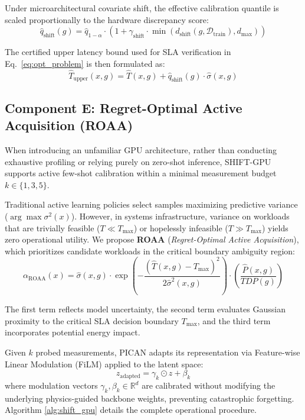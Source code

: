 \documentclass[3p,12pt]{elsarticle}
\begin{document}
Under microarchitectural covariate shift, the effective calibration quantile is scaled proportionally to the hardware discrepancy score:
\begin{equation}
\hat{q}_{\text{shift}}(g) = \hat{q}_{1-\alpha} \cdot \left(1 + \gamma_{\text{shift}} \cdot \min\left(d_{\text{shift}}(g, \mathcal{D}_{\text{train}}), d_{\max}\right)\right)
\end{equation}

The certified upper latency bound used for SLA verification in Eq.~\eqref{eq:opt_problem} is then formulated as:
\begin{equation}
\hat{T}_{\text{upper}}(x, g) = \hat{T}(x, g) + \hat{q}_{\text{shift}}(g) \cdot \hat{\sigma}(x, g)
\end{equation}

\subsection{Component E: Regret-Optimal Active Acquisition (ROAA)}
When introducing an unfamiliar GPU architecture, rather than conducting exhaustive profiling or relying purely on zero-shot inference, SHIFT-GPU supports active few-shot calibration within a minimal measurement budget $k \in \{1, 3, 5\}$.

Traditional active learning policies select samples maximizing predictive variance ($\arg\max \sigma^2(x)$). However, in systems infrastructure, variance on workloads that are trivially feasible ($T \ll T_{\max}$) or hopelessly infeasible ($T \gg T_{\max}$) yields zero operational utility. We propose \textbf{ROAA} (\textit{Regret-Optimal Active Acquisition}), which prioritizes candidate workloads in the critical boundary ambiguity region:
\begin{equation}
\label{eq:roaa}
\alpha_{\text{ROAA}}(x) = \hat{\sigma}(x, g) \cdot \exp\left( - \frac{(\hat{T}(x, g) - T_{\max})^2}{2 \hat{\sigma}^2(x, g)} \right) \cdot \left(\frac{\hat{P}(x, g)}{TDP(g)}\right)
\end{equation}

The first term reflects model uncertainty, the second term evaluates Gaussian proximity to the critical SLA decision boundary $T_{\max}$, and the third term incorporates potential energy impact. 

Given $k$ probed measurements, PICAN adapts its representation via Feature-wise Linear Modulation (FiLM) \citep{perez2018film} applied to the latent space:
\begin{equation}
z_{\text{adapted}} = \gamma_k \odot z + \beta_k
\end{equation}
where modulation vectors $\gamma_k, \beta_k \in \mathbb{R}^d$ are calibrated without modifying the underlying physics-guided backbone weights, preventing catastrophic forgetting. Algorithm \ref{alg:shift_gpu} details the complete operational procedure.
\end{document}
